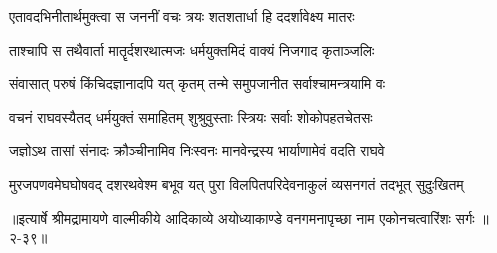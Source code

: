 \twolineshloka
{एतावदभिनीतार्थमुक्त्वा स जननीं वचः}
{त्रयः शतशतार्धा हि ददर्शावेक्ष्य मातरः} %

\twolineshloka
{ताश्चापि स तथैवार्ता मातॄर्दशरथात्मजः}
{धर्मयुक्तमिदं वाक्यं निजगाद कृताञ्जलिः} %

\twolineshloka
{संवासात् परुषं किंचिदज्ञानादपि यत् कृतम्}
{तन्मे समुपजानीत सर्वाश्चामन्त्रयामि वः} %

\twolineshloka
{वचनं राघवस्यैतद् धर्मयुक्तं समाहितम्}
{शुश्रुवुस्ताः स्त्रियः सर्वाः शोकोपहतचेतसः} %

\twolineshloka
{जज्ञोऽथ तासां संनादः क्रौञ्चीनामिव निःस्वनः}
{मानवेन्द्रस्य भार्याणामेवं वदति राघवे} %

\twolineshloka
{मुरजपणवमेघघोषवद् दशरथवेश्म बभूव यत् पुरा}
{विलपितपरिदेवनाकुलं व्यसनगतं तदभूत् सुदुःखितम्} %


॥इत्यार्षे श्रीमद्रामायणे वाल्मीकीये आदिकाव्ये अयोध्याकाण्डे वनगमनापृच्छा नाम एकोनचत्वारिंशः सर्गः ॥२-३९॥
